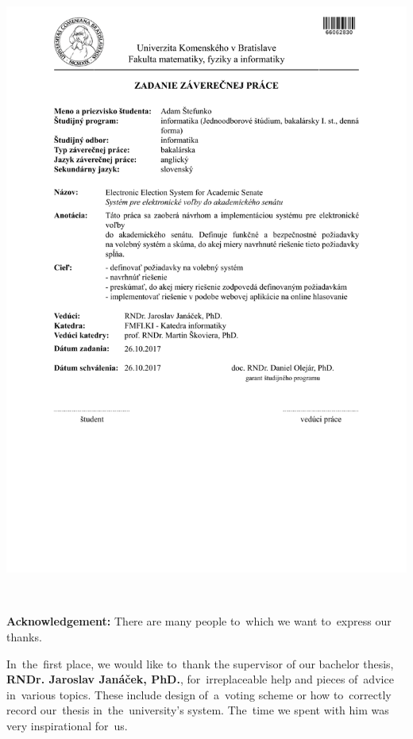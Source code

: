 \documentclass[12pt, oneside]{book}
\begin{document}
\newpage 
\thispagestyle{empty}
\hspace{-4cm}\includegraphics[width=1.3\textwidth]{images/zadanie_SVK}


\frontmatter

\setcounter{page}{3}
\newpage 
~

\vfill
{\bf Acknowledgement:} 
There are many people to~which we want to~express our thanks. 

In~the~first place, we would like to~thank the supervisor of our bachelor thesis, \textbf{RNDr. Jaroslav Janáček, PhD.}, for~irreplaceable help and pieces of~advice in~various topics. These include design of~a~voting scheme or how to~correctly record our~thesis in~the~university's system. The~time we spent with him was very inspirational for~us.
\end{document}
